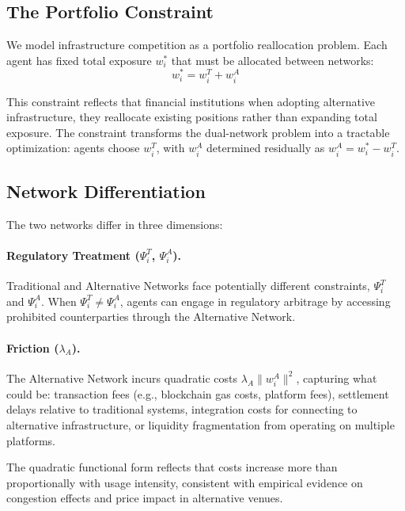 \documentclass[12pt]{article}
\begin{document}
\subsection{The Portfolio Constraint}

We model infrastructure competition as a portfolio reallocation problem. Each agent has fixed total exposure $w_i^*$ that must be allocated between networks:
\begin{equation}
w_i^* = w_i^T + w_i^A
\label{eq:portfolio_constraint}
\end{equation}

This constraint reflects that financial institutions when adopting alternative infrastructure, they reallocate existing positions rather than expanding total exposure. The constraint transforms the dual-network problem into a tractable optimization: agents choose $w_i^T$, with $w_i^A$ determined residually as $w_i^A = w_i^* - w_i^T$.

\subsection{Network Differentiation}

The two networks differ in three dimensions:

\paragraph{Regulatory Treatment ($\Psi_i^T$, $\Psi_i^A$).} Traditional and Alternative Networks face potentially different constraints, $\Psi_i^T$ and $\Psi_i^A$. When $\Psi_i^T \neq \Psi_i^A$, agents can engage in regulatory arbitrage by accessing prohibited counterparties through the Alternative Network. 

\paragraph{Friction ($\lambda_A$).} The Alternative Network incurs quadratic costs $\lambda_A \|w_i^A\|^2$, capturing what could be: transaction fees (e.g., blockchain gas costs, platform fees), settlement delays relative to traditional systems, integration costs for connecting to alternative infrastructure, or liquidity fragmentation from operating on multiple platforms.

The quadratic functional form reflects that costs increase more than proportionally with usage intensity, consistent with empirical evidence on congestion effects and price impact in alternative venues.
\end{document}

